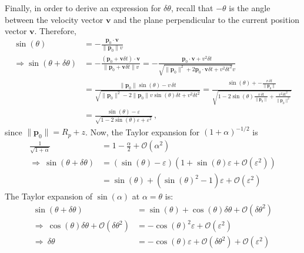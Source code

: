 Finally, in order to derive an expression for $\delta\theta$, recall that $-\theta$ is the angle between the velocity vector $\pmb{v}$ and the plane perpendicular to the current position vector $\pmb{v}$. Therefore,
\begin{align*}
    \sin(\theta) &= -\frac{\pmb{p}_0 \cdot \pmb{v}}{\|\pmb{p}_0\|v} \\
    \Rightarrow \sin(\theta + \delta\theta) &= -\frac{(\pmb{p}_0 + \pmb{v}\delta t) \cdot \pmb{v}}{\|\pmb{p}_0 + \pmb{v}\delta t\|v} = - \frac{\pmb{p}_0\cdot \pmb{v} + v^2\delta t}{\sqrt{\|\pmb{p}_0\|^2 + 2\pmb{p}_0 \cdot \pmb{v}\delta t + v^2\delta t^2}v} \\
    &= \frac{\|\pmb{p}_0\| \sin(\theta) - v\,\delta t}{\sqrt{\|\pmb{p}_0\|^2 - 2\|\pmb{p}_0\|v\sin(\theta)\delta t + v^2\delta t^2}} = \frac{\sin(\theta) + -\frac{v\,\delta t}{\|\pmb{p}_0\|}}{\sqrt{1 - 2\sin(\theta)\frac{v\,\delta t}{\|\pmb{p}_0\|} + \frac{v^2\delta t^2}{\|\pmb{p}_0\|^2}}} \\
    &= \frac{\sin(\theta) - \varepsilon}{\sqrt{1 - 2\sin(\theta)\varepsilon + \varepsilon^2}}\,,
\end{align*}
since $\|\pmb{p}_0\| = R_p + z$. Now, the Taylor expansion for $(1+\alpha)^{-1/2}$ is
\begin{align*}
    \frac{1}{\sqrt{1 + \alpha}} &= 1 - \frac{\alpha}{2} + \mathcal{O}(\alpha^2) \\
    \Rightarrow\ \sin(\theta + \delta\theta) &= (\sin(\theta) - \varepsilon)(1 + \sin(\theta)\varepsilon + \mathcal{O}(\varepsilon^2)) \\
    &= \sin(\theta) + (\sin(\theta)^2 - 1) \varepsilon + \mathcal{O}(\varepsilon^2)
\end{align*}
The Taylor expansion of $\sin(\alpha)$ at $\alpha = \theta$ is:
\begin{align}
    \sin(\theta + \delta\theta) &= \sin(\theta) + \cos(\theta)\delta\theta + \mathcal{O}(\delta\theta^2) \nonumber\\
    \Rightarrow\ \cos(\theta)\delta\theta + \mathcal{O}(\delta\theta^2) &= -\cos(\theta)^2\varepsilon + \mathcal{O}(\varepsilon^2) \nonumber\\
    \Rightarrow\ \delta\theta &= -\cos(\theta)\varepsilon + \mathcal{O}(\delta\theta^2) + \mathcal{O}(\varepsilon^2)
\end{align}

